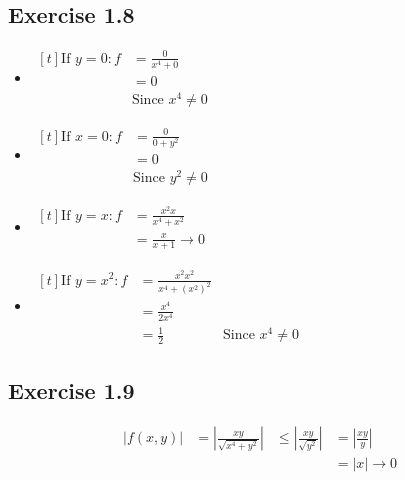 \documentclass[11pt,fleqn]{book} %
\begin{document}
\subsection*{Exercise 1.8}

\begin{itemize}
    \item 
    $\begin{aligned}[t]
        \text{If } y = 0: f & = \frac{0}{x^4 + 0}      \\
                            & = 0                      \\
                            & \text{Since } x^4 \neq 0
    \end{aligned}$

    \item 
    $\begin{aligned}[t]
        \text{If } x = 0: f & = \frac{0}{0 + y^2}      \\
                            & = 0                      \\
                            & \text{Since } y^2 \neq 0
    \end{aligned}$

    \item 
    $\begin{aligned}[t]
        \text{If } y = x: f & = \frac{x^2x}{x^4 + x^2} \\
                            & = \frac{x}{x+1} \to 0
    \end{aligned}$

    \item 
    $\begin{aligned}[t]
        \text{If } y = x^2: f & = \frac{x^2x^2}{x^4 + (x^2)^2} \\
                              & = \frac{x^4}{2x^4}             \\
                              & = \frac{1}{2}                  
                              & \text{Since } x^4 \neq 0
    \end{aligned}$
\end{itemize}

\subsection*{Exercise 1.9}

\begin{align*}
    |f(x, y)| & = \left| \frac{xy}{\sqrt{x^4 + y^2}} \right|
              & \le \left| \frac{xy}{\sqrt{y^2}} \right|
              & = \left| \frac{xy}{y} \right|                \\
              & & & = |x| \to 0
\end{align*}
\end{document}

